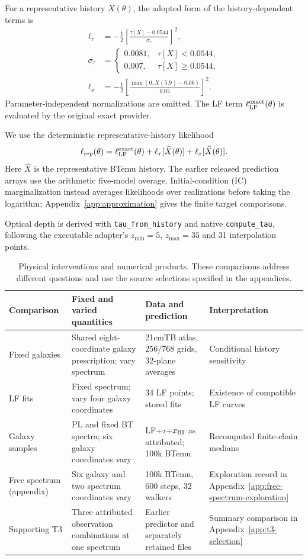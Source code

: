 For a representative history $X(\theta)$, the adopted form of the history-dependent terms is
\begin{align}
\ell_\tau&=-\frac{1}{2}\left[\frac{\tau[X]-0.0544}{\sigma_\tau}\right]^2,\\
\sigma_\tau&=\begin{cases}0.0081,&\tau[X]<0.0544,\\0.007,&\tau[X]\geq0.0544,\end{cases}\\
\ell_x&=-\frac{1}{2}\left[\frac{\max(0,X(5.9)-0.06)}{0.05}\right]^2.
\end{align}
Parameter-independent normalizations are omitted. The LF term $\ell_{\rm LF}^{\rm exact}(\theta)$ is evaluated by the original exact provider.

We use the deterministic representative-history likelihood
\begin{equation}
\ell_{\rm rep}(\theta)=\ell_{\rm LF}^{\rm exact}(\theta)
+\ell_\tau[\widehat X(\theta)]+\ell_x[\widehat X(\theta)].
\end{equation}
Here $\widehat X$ is the representative BTemu history. The earlier released prediction arrays use the arithmetic five-model average. Initial-condition (IC) marginalization instead averages likelihoods over realizations before taking the logarithm; Appendix~\ref{app:approximation} gives the finite target comparisons.

Optical depth is derived with \texttt{tau\_from\_history} and native \texttt{compute\_tau}, following the executable adapter's $z_{\min}=5$, $z_{\max}=35$ and 31 interpolation points.

\begin{table}[t]\centering\small
\caption{Physical interventions and numerical products. These comparisons address different questions and use the source selections specified in the appendices.}\label{tab:experiment-map}
\begin{tabular}{p{}p{}p{}p{}}\toprule
Comparison & Fixed and varied quantities & Data and prediction & Interpretation\\\midrule
Fixed galaxies & Shared eight-coordinate galaxy prescription; vary spectrum & 21cmTB atlas, 256/768 grids, 32-plane averages & Conditional history sensitivity\\
LF fits & Fixed spectrum; vary four galaxy coordinates & 34 LF points; stored fits & Existence of compatible LF curves\\
Galaxy samples & PL and fixed BT spectra; six galaxy coordinates vary & LF+$\tau$+$x_{\rm HI}$ as attributed; 100k BTemu & Recomputed finite-chain medians\\
Free spectrum (appendix) & Six galaxy and two spectrum coordinates vary & 100k BTemu, 600 steps, 32 walkers & Exploration record in Appendix~\ref{app:free-spectrum-exploration}\\
Supporting T3 & Three attributed observation combinations at one spectrum & Earlier predictor and separately retained files & Summary comparison in Appendix~\ref{app:t3-selection}\\\bottomrule
\end{tabular}\end{table}

